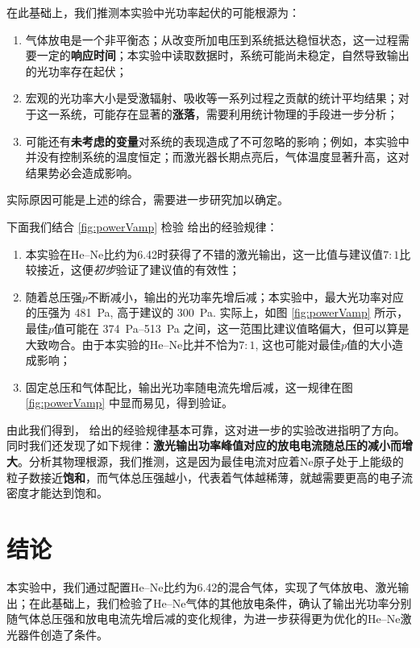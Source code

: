 \documentclass[aps,pre,12pt,preprint,%
	onecolumn,showpacs,showkeys,nofootinbib]{revtex4-1}
\begin{document}
	在此基础上，我们推测本实验中光功率起伏的可能根源为：
	\begin{enumerate}
	\item 气体放电是一个非平衡态；从改变所加电压到系统抵达稳恒状态，这一过程需要一定的\textbf{响应时间}；本实验中读取数据时，系统可能尚未稳定，自然导致输出的光功率存在起伏；
	\item 宏观的光功率大小是受激辐射、吸收等一系列过程之贡献的统计平均结果；对于这一系统，可能存在显著的\textbf{涨落}，需要利用统计物理的手段进一步分析；
	\item 可能还有\textbf{未考虑的变量}对系统的表现造成了不可忽略的影响；例如，本实验中并没有控制系统的温度恒定；而激光器长期点亮后，气体温度显著升高，这对结果势必会造成影响。
	\end{enumerate}
	实际原因可能是上述的综合，需要进一步研究加以确定。
	
	\newparagraph
	下面我们结合 \ref{fig:powerVamp} 检验 \cite{textbook} 给出的经验规律：
	\begin{enumerate}
	\item 本实验在He--Ne比约为6.42时获得了不错的激光输出，这一比值与建议值$7:1$比较接近，这便\textit{初步}验证了建议值的有效性；
	\item 随着总压强$p$不断减小，输出的光功率先增后减；本实验中，最大光功率对应的压强为 \SI{481}{\Pa}, 高于建议的 \SI{300}{\Pa}. 实际上，如图 \ref{fig:powerVamp} 所示，最佳$p$值可能在 \SIrange{374}{513}{\Pa} 之间，这一范围比建议值略偏大，但可以算是大致吻合。由于本实验的He--Ne比并不恰为$7:1$, 这也可能对最佳$p$值的大小造成影响；
	\item 固定总压和气体配比，输出光功率随电流先增后减，这一规律在图 \ref{fig:powerVamp} 中显而易见，得到验证。
	\end{enumerate}
	
	由此我们得到，\cite{textbook} 给出的经验规律基本可靠，这对进一步的实验改进指明了方向。同时我们还发现了如下规律：\textbf{激光输出功率峰值对应的放电电流随总压的减小而增大}。分析其物理根源，我们推测，这是因为最佳电流对应着Ne原子处于上能级的粒子数接近\textbf{饱和}，而气体总压强越小，代表着气体越稀薄，就越需要更高的电子流密度才能达到饱和。
\section{结论}
	本实验中，我们通过配置He--Ne比约为6.42的混合气体，实现了气体放电、激光输出；在此基础上，我们检验了He--Ne气体的其他放电条件，确认了输出光功率分别随气体总压强和放电电流先增后减的变化规律，为进一步获得更为优化的He--Ne激光器件创造了条件。
\end{document}
